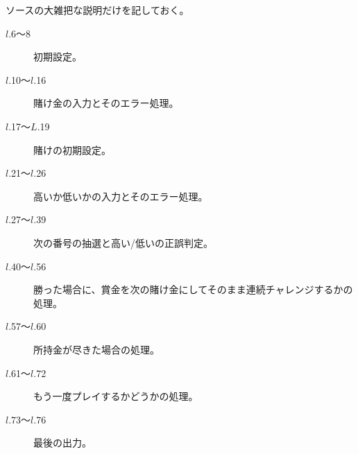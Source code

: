 ソースの大雑把な説明だけを記しておく。
\begin{description}
\item[$l$.6〜8] 初期設定。
\item[$l$.10〜$l$.16] 賭け金の入力とそのエラー処理。
\item[$l$.17〜$L$.19] 賭けの初期設定。
\item[$l$.21〜$l$.26] 高いか低いかの入力とそのエラー処理。
\item[$l$.27〜$l$.39] 次の番号の抽選と高い/低いの正誤判定。
\item[$l$.40〜$l$.56] 勝った場合に、賞金を次の賭け金にしてそのまま連続チャレンジするかの処理。
\item[$l$.57〜$l$.60] 所持金が尽きた場合の処理。
\item[$l$.61〜$l$.72] もう一度プレイするかどうかの処理。
\item[$l$.73〜$l$.76] 最後の出力。
\end{description}

\newpage

